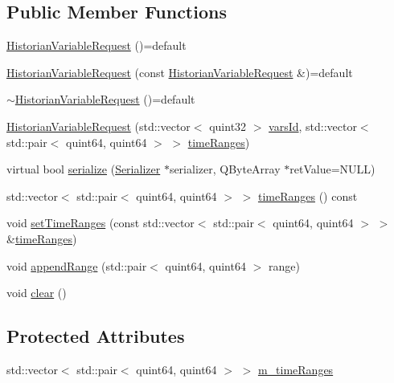 \subsection*{Public Member Functions}
\begin{DoxyCompactItemize}
\item 
\hyperlink{class_a_h_p_1_1_historian_variable_request_a0a9d35a33b5b9d5f3a35652d37fb4359}{Historian\+Variable\+Request} ()=default
\item 
\hyperlink{class_a_h_p_1_1_historian_variable_request_a45831ea8e8b920fe4d0c7f09827ef72e}{Historian\+Variable\+Request} (const \hyperlink{class_a_h_p_1_1_historian_variable_request}{Historian\+Variable\+Request} \&)=default
\item 
\hyperlink{class_a_h_p_1_1_historian_variable_request_a3fd4ad8e9e6747e9b2e9f6c16d9f86cf}{$\sim$\+Historian\+Variable\+Request} ()=default
\item 
\hyperlink{class_a_h_p_1_1_historian_variable_request_a5b2243b33bc5eacc21cea96100d0e816}{Historian\+Variable\+Request} (std\+::vector$<$ quint32 $>$ \hyperlink{class_a_h_p_1_1_variable_request_aa780d24b9259856ada9419e90eaa8225}{vars\+Id}, std\+::vector$<$ std\+::pair$<$ quint64, quint64 $>$ $>$ \hyperlink{class_a_h_p_1_1_historian_variable_request_a9f3ef8180202a068b292a2ce70e07cdf}{time\+Ranges})
\item 
virtual bool \hyperlink{class_a_h_p_1_1_historian_variable_request_ae6145d66ce7729794a3c1f2c23a9cddf}{serialize} (\hyperlink{class_serializer}{Serializer} $\ast$serializer, Q\+Byte\+Array $\ast$ret\+Value=N\+U\+L\+L)
\item 
std\+::vector$<$ std\+::pair$<$ quint64, quint64 $>$ $>$ \hyperlink{class_a_h_p_1_1_historian_variable_request_a9f3ef8180202a068b292a2ce70e07cdf}{time\+Ranges} () const 
\item 
void \hyperlink{class_a_h_p_1_1_historian_variable_request_a8e53fc2bdd3e335252b8874abbd84316}{set\+Time\+Ranges} (const std\+::vector$<$ std\+::pair$<$ quint64, quint64 $>$ $>$ \&\hyperlink{class_a_h_p_1_1_historian_variable_request_a9f3ef8180202a068b292a2ce70e07cdf}{time\+Ranges})
\item 
void \hyperlink{class_a_h_p_1_1_historian_variable_request_a8af998ae30fc51ad07c348dfc7562c33}{append\+Range} (std\+::pair$<$ quint64, quint64 $>$ range)
\item 
void \hyperlink{class_a_h_p_1_1_historian_variable_request_a35f78394b44062ea769c4f9177410dc6}{clear} ()
\end{DoxyCompactItemize}
\subsection*{Protected Attributes}
\begin{DoxyCompactItemize}
\item 
std\+::vector$<$ std\+::pair$<$ quint64, quint64 $>$ $>$ \hyperlink{class_a_h_p_1_1_historian_variable_request_ad71c11988971419306235cb25c1a32f0}{m\+\_\+time\+Ranges}
\end{DoxyCompactItemize}


